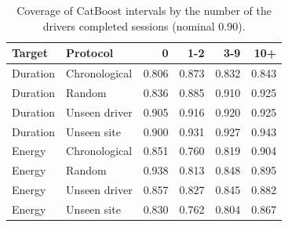 \begin{table}[H]\centering\small
\caption{Coverage of CatBoost intervals by the number of the driver\textquotesingle s completed sessions (nominal 0.90).}\label{tab:s-condcov}
\begin{tabular}{llrrrr}\toprule
Target & Protocol & 0 & 1-2 & 3-9 & 10+ \\\midrule
Duration & Chronological & 0.806 & 0.873 & 0.832 & 0.843 \\
Duration & Random & 0.836 & 0.885 & 0.910 & 0.925 \\
Duration & Unseen driver & 0.905 & 0.916 & 0.920 & 0.925 \\
Duration & Unseen site & 0.900 & 0.931 & 0.927 & 0.943 \\
Energy & Chronological & 0.851 & 0.760 & 0.819 & 0.904 \\
Energy & Random & 0.938 & 0.813 & 0.848 & 0.895 \\
Energy & Unseen driver & 0.857 & 0.827 & 0.845 & 0.882 \\
Energy & Unseen site & 0.830 & 0.762 & 0.804 & 0.867 \\
\bottomrule\end{tabular}\end{table}

